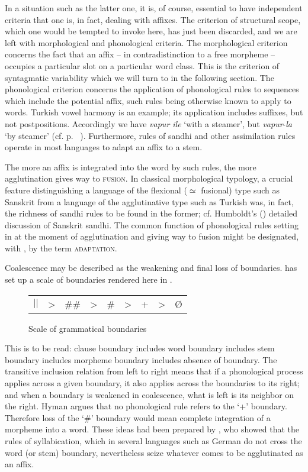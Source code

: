 In a situation such as the latter one, it is, of course, essential to have independent criteria that one is, in fact, dealing with affixes. The criterion of structural scope, which one would be tempted to invoke here, has just been discarded, and we are left with morphological and phonological criteria. The morphological criterion concerns the fact that an affix -- in contradistinction to a free morpheme -- occupies a particular slot on a particular word class. This is the criterion of syntagmatic variability which we will turn to in the following section. The phonological criterion concerns the application of phonological rules to sequences which include the potential affix, such rules being otherwise known to apply to words. Turkish vowel harmony is an example; its application includes suffixes, but not postpositions. Accordingly we have \textit{vapur ile} ‘with a steamer’, but \textit{vapur}{}-\textit{la} ‘by steamer’ (cf. p.~\pageref{page89}\chk%
 ). Furthermore, rules of sandhi and other assimilation rules operate in most languages to adapt an affix to a stem.

The more an affix is integrated into the word by such rules, the more agglutination gives way to \textsc{fusion}. In classical morphological typology, a crucial feature distinguishing a language of the flexional (${\simeq}$ fusional) type such as Sanskrit from a language of the agglutinative type such as Turkish was, in fact, the richness of sandhi rules to be found in the former; cf. Humboldt's (\citeyear[506--511]{Humboldt1836}) detailed discussion of Sanskrit sandhi. The common function of phonological rules setting in at the moment of agglutination and giving way to fusion might be designated, with \citet[17--20]{HeineEtAl1984}, by the term \textsc{adaptation}.

Coalescence may be described as the weakening and final loss of boundaries. \citet[esp. §4]{Hyman1978} has set up a scale of boundaries rendered here in .

\begin{figure}
\begin{tabular}{ccccccccc}
\setlength{\tabcolsep}{2em}
$||$ & {\textgreater} & \#\# & {\textgreater} & \# & {\textgreater} & + & {\textgreater} & Ø
\end{tabular}
\caption{Scale of grammatical boundaries}\label{F10}
\end{figure}

\noindent This is to be read: clause boundary includes word boundary includes stem boundary includes morpheme boundary includes absence of boundary. The transitive inclusion relation from left to right means that if a phonological process applies across a given boundary, it also applies across the boundaries to its right; and when a boundary is weakened in coalescence, what is left is its neighbor on the right. Hyman argues that no phonological rule refers to the ‘+’ boundary. Therefore loss of the ‘\#’ boundary would mean complete integration of a morpheme into a word. These ideas had been prepared by \citet[211]{Kuryłowicz1948}, who showed that the rules of syllabication, which in several languages such as German do not cross the word (or stem) boundary, nevertheless seize whatever comes to be agglutinated as an affix.

